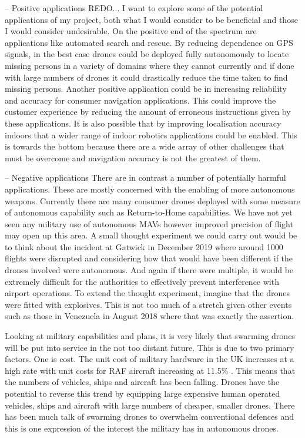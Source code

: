 \documentclass[]{../resources/final_report}
\begin{document}
-- Positive applications REDO...
I want to explore some of the potential applications of my project, both what I would consider 
to be beneficial and those I would consider undesirable. 
On the positive end of the spectrum are applications like automated search and rescue. By reducing
dependence on GPS signals, in the best case drones could be deployed fully autonomously to locate
missing persons in a variety of domains where they cannot currently and if done with large numbers 
of drones it could drastically reduce the time taken to find missing persons.
Another positive application could be in increasing reliability and accuracy for consumer navigation 
applications. This could improve the customer experience by reducing the amount of erroneous 
instructions given by these applications.
It is also possible that by improving localisation accuracy indoors that a wider range of indoor 
robotics applications could be enabled. This is towards the bottom because there are a wide array 
of other challenges that must be overcome and navigation accuracy is not the greatest of them.


-- Negative applications
There are in contrast a number of potentially harmful applications. These are mostly concerned with 
the enabling of more autonomous weapons. Currently there are many consumer drones deployed with some 
measure of autonomous capability such as Return-to-Home capabilities. We have not yet seen any military 
use of autonomous MAVs however improved precision of flight may open up this area. A small thought 
experiment we could carry out would be to think about the incident at Gatwick in December 2019 where 
around 1000 flights were disrupted \cite{Gatwick_Airport} and considering how that would have been 
different if the drones involved were autonomous. And again if there were multiple, it would be extremely 
difficult for the authorities to effectively prevent interference with airport operations. To extend 
the thought experiment, imagine that the drones were fitted with explosives. This is not too much of 
a stretch given other events such as those in Venezuela in August 2018 \cite{Caracas_drone} where that was exactly 
the assertion.

Looking at military capabilities and plans, it is very likely that swarming drones will be put into 
service in the not too distant future. This is due to two primary factors. One is cost. The unit cost of 
military hardware in the UK increases at a high rate with unit costs for RAF aircraft increasing at 11.5\% \cite{RUSI_defence_costs}. 
This means that the numbers of vehicles, ships and aircraft has been falling. Drones have the potential to reverse this trend by 
equipping large expensive human operated vehicles, ships and aircraft with large numbers of cheaper, 
smaller drones. There has been much talk of swarming drones to overwhelm conventional defences and this 
is one expression of the interest the military has in autonomous drones.
\end{document}
